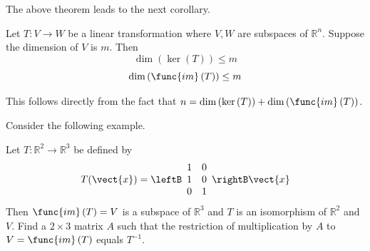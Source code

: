 The above theorem leads to the next corollary.

\begin{corollary}{}
Let $T:V\rightarrow W$ be a linear transformation where $V,W$ are subspaces of $\mathbb{R}^n$. Suppose the dimension of $V$ is $m$. Then 
\[
\dim \left( \ker \left( T\right) \right) \leq m
\]
\[
\dim \left( \func{im}\left( T \right) \right) \leq m
\]
\end{corollary}

This follows directly from the fact that $n=\dim \left( \ker \left( T\right) \right) +\dim \left( \func{im}\left(
T\right) \right) $.

Consider the following example.

\begin{example}{}
Let $T:\mathbb{R}^{2}\rightarrow \mathbb{R}^{3}$ be defined by 
\begin{equation*}
T(\vect{x})=\leftB
\begin{array}{rr}
1 & 0 \\ 
1 & 0 \\ 
0 & 1
\end{array}
\rightB \vect{x}
\end{equation*}
Then $\func{im}\left( T\right) =V$ is a subspace of $\mathbb{R}^{3}$ and $T$
is an isomorphism of $\mathbb{R}^{2}$ and $V$. Find a $2\times 3$ matrix $A$
such that the restriction of multiplication by $A$ to $V=\func{im}\left(
T\right) $ equals $T^{-1}$. 
\end{example}

